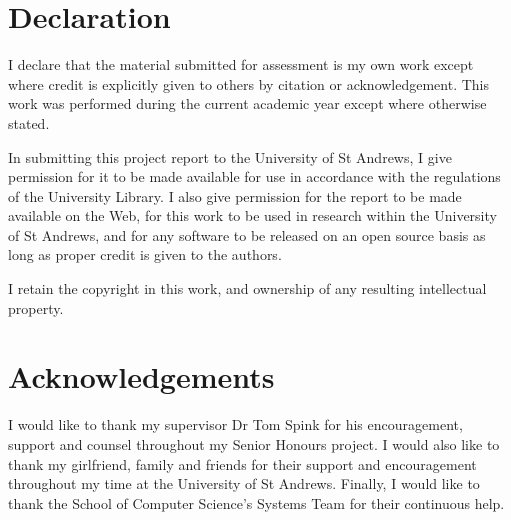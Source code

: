\chapter*{Declaration}
I declare that the material submitted for assessment is my own work except
where credit is explicitly given to others by citation or acknowledgement. This
work was performed during the current academic year except where otherwise
stated.


In submitting this project report to the University of St Andrews, I give
permission for it to be made available for use in accordance with the
regulations of the University Library. I also give permission for the report to
be made available on the Web, for this work to be used in research within the
University of St Andrews, and for any software to be released on an open source
basis as long as proper credit is given to the authors.


I retain the copyright in this work, and ownership of any resulting intellectual property.

{\let\clearpage\relax \chapter*{Acknowledgements}}
I would like to thank my supervisor Dr Tom Spink for his
encouragement, support and counsel throughout my Senior Honours project. I
would also like to thank my girlfriend, family and friends for their support and
encouragement throughout my time at the University of St Andrews. Finally, I would like to thank the School
of Computer Science's Systems Team for their continuous help.

